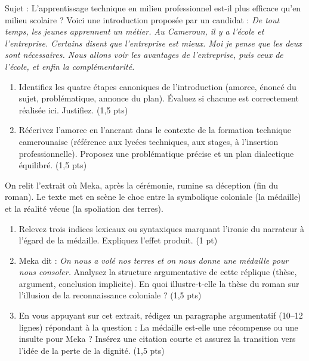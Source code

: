 \documentclass[11pt]{article}
\begin{document}
\begin{exercice}
Sujet : \og L'apprentissage technique en milieu professionnel est-il plus efficace qu'en milieu scolaire ? \fg{}
Voici une introduction proposée par un candidat :
\og \textit{De tout temps, les jeunes apprennent un métier. Au Cameroun, il y a l'école et l'entreprise. Certains disent que l'entreprise est mieux. Moi je pense que les deux sont nécessaires. Nous allons voir les avantages de l'entreprise, puis ceux de l'école, et enfin la complémentarité.}\fg{}
\begin{enumerate}
    \item Identifiez les quatre étapes canoniques de l'introduction (amorce, énoncé du sujet, problématique, annonce du plan). Évaluez si chacune est correctement réalisée ici. Justifiez. (1,5 pts)
    \item Réécrivez l'amorce en l'ancrant dans le contexte de la formation technique camerounaise (référence aux lycées techniques, aux stages, à l'insertion professionnelle). Proposez une problématique précise et un plan dialectique équilibré. (1,5 pts)
\end{enumerate}
\end{exercice}

\begin{exercice}
On relit l'extrait où Meka, après la cérémonie, rumine sa déception (fin du roman). Le texte met en scène le choc entre la symbolique coloniale (la médaille) et la réalité vécue (la spoliation des terres).
\begin{enumerate}
    \item Relevez trois indices lexicaux ou syntaxiques marquant l'ironie du narrateur à l'égard de la médaille. Expliquez l'effet produit. (1 pt)
    \item Meka dit : \og \textit{On nous a volé nos terres et on nous donne une médaille pour nous consoler.}\fg{} Analysez la structure argumentative de cette réplique (thèse, argument, conclusion implicite). En quoi illustre-t-elle la thèse du roman sur l'illusion de la reconnaissance coloniale ? (1,5 pts)
    \item En vous appuyant sur cet extrait, rédigez un paragraphe argumentatif (10--12 lignes) répondant à la question : \og La médaille est-elle une récompense ou une insulte pour Meka ? \fg{} Insérez une citation courte et assurez la transition vers l'idée de la perte de la dignité. (1,5 pts)
\end{enumerate}
\end{exercice}
\end{document}

